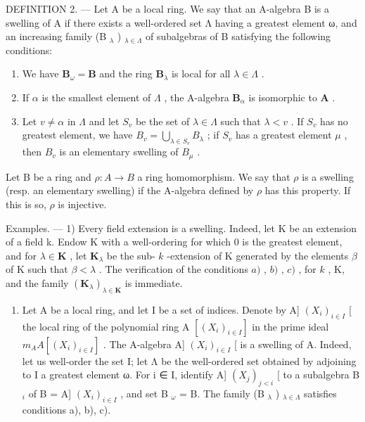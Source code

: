 DEFINITION 2. --- Let A be a local ring. We say that an A-algebra B is a swelling of A if there exists a well-ordered set Λ having a greatest element ω, and an increasing family (B \(_{λ}\) ) \(_{λ∈Λ}\) of subalgebras of B satisfying the following conditions:

\begin{enumerate}
\def\labelenumi{\alph{enumi})}
\item
  We have \(\mathbf{B}_{\omega} = \mathbf{B}\) and the ring \(\mathbf{B}_{\lambda}\) is local for all \(\lambda \in \Lambda\) .
\item
  If \(\alpha\) is the smallest element of \(\Lambda\) , the A-algebra \(\mathbf{B}_{\alpha}\) is isomorphic to \(\mathbf{A}\) .
\item
  Let \(v \neq \alpha\) in \(\Lambda\) and let \(S_{v}\) be the set of \(\lambda \in \Lambda\) such that \(\lambda < v\) . If \(S_{v}\) has no greatest element, we have \(B_{v} = \bigcup_{\lambda \in S_{v}} B_{\lambda}\) ; if \(S_{v}\) has a greatest element \(\mu\) , then \(B_{v}\) is an elementary swelling of \(B_{\mu}\) .
\end{enumerate}

Let B be a ring and \(\rho: A \to B\) a ring homomorphism. We say that \(\rho\) is a swelling (resp. an elementary swelling) if the A-algebra defined by \(\rho\) has this property. If this is so, \(\rho\) is injective.

Examples. --- 1) Every field extension is a swelling. Indeed, let K be an extension of a field k. Endow K with a well-ordering for which 0 is the greatest element, and for \(\lambda \in \mathbf{K}\) , let \(\mathbf{K}_{\lambda}\) be the sub- \(k\) -extension of K generated by the elements \(\beta\) of K such that \(\beta < \lambda\) . The verification of the conditions \(a)\) , \(b)\) , \(c)\) , for \(k\) , K, and the family \((\mathbf{K}_{\lambda})_{\lambda \in \mathbf{K}}\) is immediate.

\begin{enumerate}
\def\labelenumi{\arabic{enumi})}
\setcounter{enumi}{1}
\tightlist
\item
  Let A be a local ring, and let I be a set of indices. Denote by A{]} \((X_{i})_{i\in I}\) {[} the local ring of the polynomial ring A \([(X_{i})_{i\in I}]\) in the prime ideal \(m_{A}A[(X_{i})_{i\in I}]\) . The A-algebra A{]} \((X_{i})_{i\in I}\) {[} is a swelling of A. Indeed, let us well-order the set I; let Λ be the well-ordered set obtained by adjoining to I a greatest element ω. For i ∈ I, identify A{]} \((X_{j})_{j<i}\) {[} to a subalgebra B \(_{i}\) of B = A{]} \((X_{i})_{i\in I}\) , and set B \(_{\omega}\) = B. The family (B \(_{\lambda}\) ) \(_{\lambda\in\Lambda}\) satisfies conditions a), b), c).
\end{enumerate}

